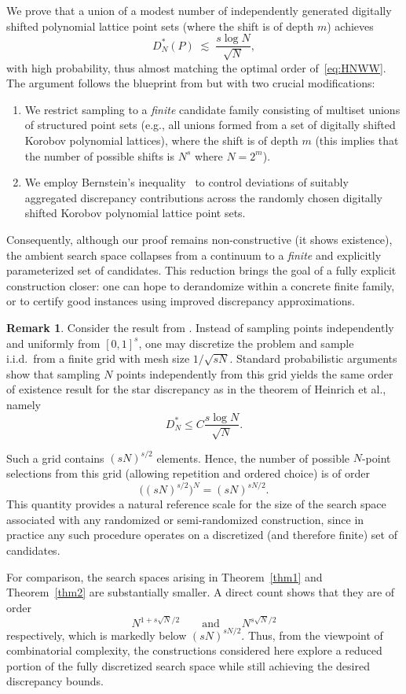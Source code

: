 \documentclass[12pt]{article}
\theoremstyle{definition}
\newtheorem{remark}[theorem]{Remark}
\numberwithin{equation}{section}
\begin{document}
We prove that a union of a modest number of independently generated digitally shifted polynomial lattice point sets (where the shift is of depth $m$) achieves
\[
  D^*_N(P) \;\lesssim\; \frac{s \log N}{\sqrt{N}},
\]
with high probability, thus almost matching the optimal order of~\eqref{eq:HNWW}. The argument follows the blueprint from \cite{HNWW01} but with two crucial modifications:
\begin{enumerate}
\item We restrict sampling to a \emph{finite} candidate family consisting of multiset unions of structured point sets (e.g., all unions formed from a set of digitally shifted Korobov polynomial lattices), where the shift is of depth $m$ (this implies that the number of possible shifts is $N^{s}$ where $N = 2^m$). 
\item We employ Bernstein's inequality~\cite{ber1946} to control deviations of suitably aggregated discrepancy contributions across the randomly chosen digitally shifted Korobov polynomial lattice point sets.
\end{enumerate}
Consequently, although our proof remains non-constructive (it shows existence), the ambient search space collapses from a continuum to a \emph{finite} and explicitly parameterized set of candidates. This reduction brings the goal of a fully explicit construction closer: one can hope to derandomize within a concrete finite family, or to certify good instances using improved discrepancy approximations.

\begin{remark}\label{re1.1}
Consider the result from \cite{HNWW01}. Instead of sampling points independently and uniformly from $[0,1]^s$, one may discretize the problem and sample i.i.d.\ from a finite grid with mesh size $1/\sqrt{sN}$. Standard probabilistic arguments show that sampling $N$ points independently from this grid yields the same order of existence result for the star discrepancy as in the theorem of Heinrich et al., namely
\[
D_N^* \le C \frac{s \log N}{\sqrt{N}}.
\]

Such a grid contains $(s N)^{s/2}$ elements. 
Hence, the number of possible $N$-point selections from this grid (allowing repetition and ordered choice) is of order
\[
\bigl((sN)^{s/2}\bigr)^N = (sN)^{sN/2}.
\]
This quantity provides a natural reference scale for the size of the search space associated with any randomized or semi-randomized construction, since in practice any such procedure operates on a discretized (and therefore finite) set of candidates.

For comparison, the search spaces arising in Theorem~\ref{thm1} and Theorem~\ref{thm2} are substantially smaller. A direct count shows that they are of order
$$N^{1+s \sqrt{N}/2} \qquad\text{and}\qquad N^{s \sqrt{N}/2}$$
respectively, which is markedly below $(sN)^{sN/2}$. 
Thus, from the viewpoint of combinatorial complexity, the constructions considered here explore a reduced portion of the fully discretized search space while still achieving the desired discrepancy bounds.
\end{remark}
\end{document}
